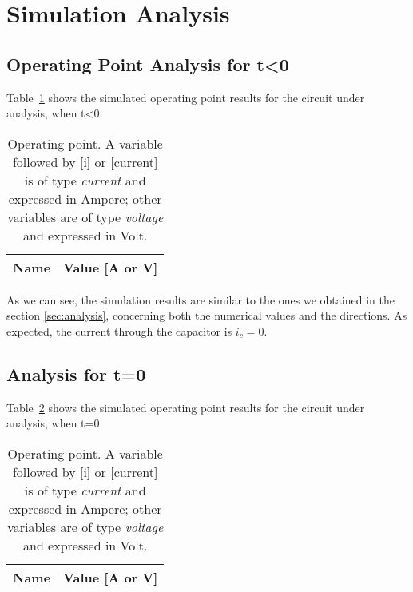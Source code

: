 \section{Simulation Analysis}
\label{sec:simulation}

\subsection{Operating Point Analysis for t<0}

\par Table~\ref{tab:op_tb0} shows the simulated operating point results for the circuit
under analysis, when t<0.
\begin{table}[H]
  \centering
  \begin{tabular}{|l|r|}
    \hline    
    {\bf Name} & {\bf Value [A or V]} \\ \hline
    
  \end{tabular}
  \caption{Operating point. A variable followed by [i] or [current] is of type {\em current}
    and expressed in Ampere; other variables are of type {\it voltage} and expressed in
    Volt.}
  \label{tab:op_tb0}
\end{table}

\par  As we can see, the simulation results are similar to the ones we obtained in the section \ref{sec:analysis}, concerning both the numerical values and the directions. As expected, the current through the capacitor is $i_c=0$.

\subsection{Analysis for t=0}
\label{subsec:t0}  


\par Table~\ref{tab:op_vs0} shows the simulated operating point results for the circuit
under analysis,  when t=0.
\begin{table}[H]
  \centering
  \begin{tabular}{|l|r|}
    \hline    
    {\bf Name} & {\bf Value [A or V]} \\ \hline
    
  \end{tabular}
  \caption{Operating point. A variable followed by [i] or [current] is of type {\em current}
    and expressed in Ampere; other variables are of type {\it voltage} and expressed in
    Volt.}
  \label{tab:op_vs0}
\end{table}


